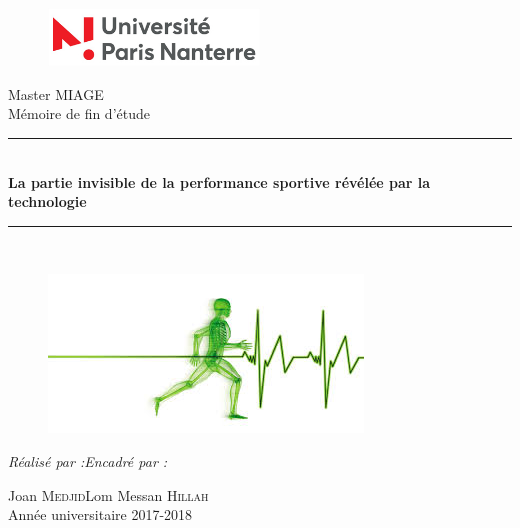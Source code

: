 \documentclass[oneside,12pt, numbered]{book}
\def\title{La partie invisible de la performance sportive révélée par la technologie} %
\begin{document}
\begin{titlepage}
        \begin{center}

            \begin{figure}
            \centering
            \vspace{30pt}
              \includegraphics[width=0.5\textwidth]{logo-nanterre}\\[1.5cm]
            \end{figure}
            
            
            {\LARGE Master MIAGE}\\[0.5cm]
            {\LARGE Mémoire de fin d'étude}\\[2cm]
            
            \rule{\linewidth}{0.6mm} \\[0.4cm]
            { \huge \bfseries \title \\[0.4cm] }
            \rule{\linewidth}{0.6mm} \\[0.4cm]
   
            \begin{figure}[H]
             \centering
            \includegraphics[scale=1]{images/analyse2.jpg}
            \end{figure}
            
            \vspace{0.4cm}
            
            \large{\emph{Réalisé par :}}\hspace{30ex}\large{\emph{Encadré par :}}
            

            \hspace{2ex} \LARGE{Joan \textsc{Medjid}}\hspace{12ex}\hspace{1ex}\LARGE{Lom Messan \textsc{Hillah}}\\[2cm]
            
            
             \Large{Année universitaire 2017-2018}
        
        \end{center}
    \end{titlepage}
        
\end{document}

